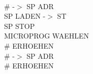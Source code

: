 \documentclass[a4paper,36pt,extrafontsizes]{memoir}
\begin{document}
~\\
\hspace*{2cm}\# -$>$ SP ADR\\
SP LADEN -$>$ ST\\
SP STOP\\
\hspace*{2cm}MICROPROG WAEHLEN\\
\hspace*{2cm}\# ERHOEHEN\\
\hspace*{2cm}\# -$>$ SP ADR\\
\hspace*{2cm}\# ERHOEHEN\\
\end{document}
